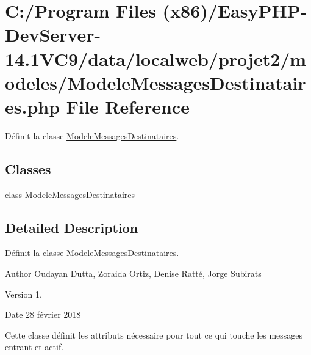 \hypertarget{_modele_messages_destinataires_8php}{}\section{C\+:/\+Program Files (x86)/\+Easy\+P\+H\+P-\/\+Dev\+Server-\/14.1\+V\+C9/data/localweb/projet2/modeles/\+Modele\+Messages\+Destinataires.php File Reference}
\label{_modele_messages_destinataires_8php}


Définit la classe \hyperlink{class_modele_messages_destinataires}{Modele\+Messages\+Destinataires}.  


\subsection*{Classes}
\begin{DoxyCompactItemize}
\item 
class \hyperlink{class_modele_messages_destinataires}{Modele\+Messages\+Destinataires}
\end{DoxyCompactItemize}


\subsection{Detailed Description}
Définit la classe \hyperlink{class_modele_messages_destinataires}{Modele\+Messages\+Destinataires}. 

\begin{DoxyAuthor}{Author}
Oudayan Dutta, Zoraida Ortiz, Denise Ratté, Jorge Subirats 
\end{DoxyAuthor}
\begin{DoxyVersion}{Version}
1. 
\end{DoxyVersion}
\begin{DoxyDate}{Date}
28 février 2018
\end{DoxyDate}
Cette classe définit les attributs nécessaire pour tout ce qui touche les messages entrant et actif. 